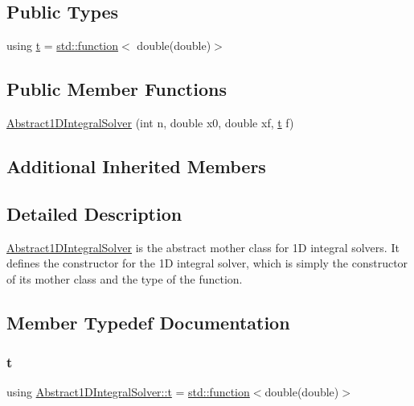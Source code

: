 \subsection*{Public Types}
\begin{DoxyCompactItemize}
\item 
using \hyperlink{class_abstract1_d_integral_solver_a7d8e60dfe7eb70e5c19dd71ac0b03880}{t} = \hyperlink{_tests_8cpp_a1c2dbde1ba7d93e381d4ccb9f603be16}{std\+::function}$<$ double(double)$>$
\end{DoxyCompactItemize}
\subsection*{Public Member Functions}
\begin{DoxyCompactItemize}
\item 
\hyperlink{class_abstract1_d_integral_solver_aff8ede805704db176953095b7578db37}{Abstract1\+D\+Integral\+Solver} (int n, double x0, double xf, \hyperlink{class_abstract1_d_integral_solver_a7d8e60dfe7eb70e5c19dd71ac0b03880}{t} f)
\end{DoxyCompactItemize}
\subsection*{Additional Inherited Members}


\subsection{Detailed Description}
\hyperlink{class_abstract1_d_integral_solver}{Abstract1\+D\+Integral\+Solver} is the abstract mother class for 1D integral solvers. It defines the constructor for the 1D integral solver, which is simply the constructor of its mother class and the type of the function. 

\subsection{Member Typedef Documentation}
\mbox{\label{class_abstract1_d_integral_solver_a7d8e60dfe7eb70e5c19dd71ac0b03880}} 
\subsubsection{\texorpdfstring{t}{t}}
{\footnotesize\ttfamily using \hyperlink{class_abstract1_d_integral_solver_a7d8e60dfe7eb70e5c19dd71ac0b03880}{Abstract1\+D\+Integral\+Solver\+::t} =  \hyperlink{_tests_8cpp_a1c2dbde1ba7d93e381d4ccb9f603be16}{std\+::function}$<$double(double)$>$}

